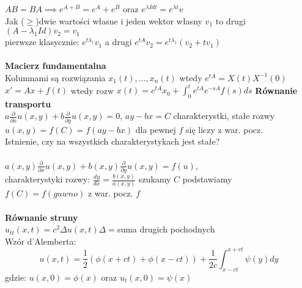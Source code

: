 \documentclass{article}
\begin{document}
$AB=BA \implies e^{A+B} = e^A+e^B$ oraz $e^{\lambda I dt} = e^{\lambda t}v$\\
Jak ($\geq$)dwie wartości własne i jeden wektor własny $v_1$ to drugi $(A-\lambda_1Id)v_2=v_1$\\
pierwsze klasycznie: $e^{t\lambda_1}v_1$ a drugi $e^{tA}v_2=e^{t\lambda_1}(v_2+tv_1)$\\\\
\textbf{Macierz fundamentalna}\\
Kolumnami są rozwiązania $x_1(t), \ldots, x_n(t)$ wtedy $e^{tA}=X(t)X^{-1}(0)$\\
$x'=Ax+f(t)$ wtedy rozw $x(t) = e^{tA}x_0 + \int_{0}^{t}e^{tA}e^{-sA}f(s)ds$
\clearpage
\textbf{Równanie transportu}\\
$a\frac{\partial}{\partial x}u(x,y) + b \frac{\partial}{\partial y} u(x,y) = 0$, $ay-bx=C$ charakterystki, stałe rozwy\\
$u(x,y) = f(C) = f(ay-bx)$ dla pewnej $f$ się liczy z war. pocz.\\
Istnienie, czy na wszystkich charakterystykach jest stałe?\\\\
$a(x,y)\frac{\partial}{\partial x}u(x,y) + b(x,y) \frac{\partial}{\partial y} u(x,y) = f(u)$,\\
charakterystyki rozwy: $\frac{dy}{dx} = \frac{b(x,y)}{a(x,y)}$ szukamy $C$ podstawiamy $f(C) = f(guwno)$ z war. pocz. $f$\\\\
\textbf{Równanie struny}\\
$u_{tt}(x,t) = c^2 \Delta u(x,t)$\quad$\Delta=$suma drugich pochodnych\\
Wzór d'Alemberta: $$u(x,t)=\frac{1}{2}(\phi(x+ct)+\phi(x-ct)) +\frac{1}{2c}\int_{x-ct}^{x+ct}\psi(y)dy$$
gdzie: $u(x,0) = \phi(x)$ oraz $u_t(x,0) = \psi(x)$
\end{document}
